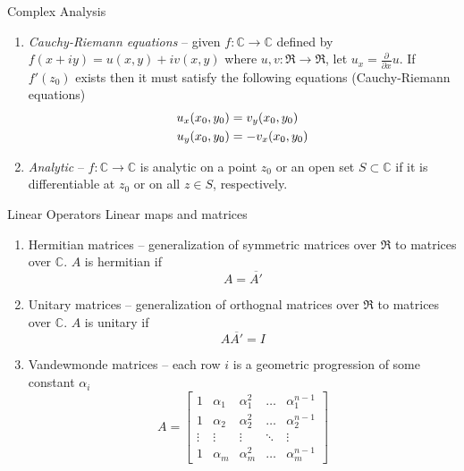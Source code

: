 \documentclass{article}
\begin{document}
\begin{section}{Complex Analysis}
\begin{enumerate}
\item \emph{Cauchy-Riemann equations} -- given $f : \mathbb{C} \to \mathbb{C}$
      defined by $f(x + iy) = u(x,y) + i v(x,y)$ where $u, v: \Re \to \Re$,
      let $u_x = \frac{\partial}{\partial x} u$. If $f'(z_0)$ exists then
      it must satisfy the following equations (Cauchy-Riemann equations)
      \begin{align}
      u_x(x_0, y_0) &= v_y(x_0, y_0) \notag \\
      u_y(x_0, y_0) &= - v_x(x_0, y_0) \notag
      \end{align}
\item \emph{Analytic} -- $f : \mathbb{C} \to \mathbb{C}$ is analytic on a
      point $z_0$ or an open set $S \subset \mathbb{C}$ if it is differentiable
      at $z_0$ or on all $z \in S$, respectively.

\end{enumerate}
\end{section}

\begin{section}{Linear Operators}
\noindent Linear maps and matrices

\begin{enumerate}
\item Hermitian matrices -- generalization of symmetric matrices over $\Re$ to
      matrices over $\mathbb{C}$. $A$ is hermitian if 
\[ A = \overline{A'} \]
\item Unitary matrices -- generalization of orthognal matrices over $\Re$ to
      matrices over $\mathbb{C}$. $A$ is unitary if
\[ A \overline{A'} = I \]
\item Vandewmonde matrices -- each row $i$ is a geometric progression of some
      constant $\alpha_i$
\[ A = \begin{bmatrix}
1 & \alpha_1 & \alpha_1^2 & \ldots & \alpha_1^{n-1} \\
1 & \alpha_2 & \alpha_2^2 & \ldots & \alpha_2^{n-1} \\
\vdots & \vdots & \vdots & \ddots & \vdots \\
1 & \alpha_m & \alpha_m^2 & \ldots & \alpha_m^{n-1}
\end{bmatrix} \]

\end{enumerate}
\end{section}
\end{document}
